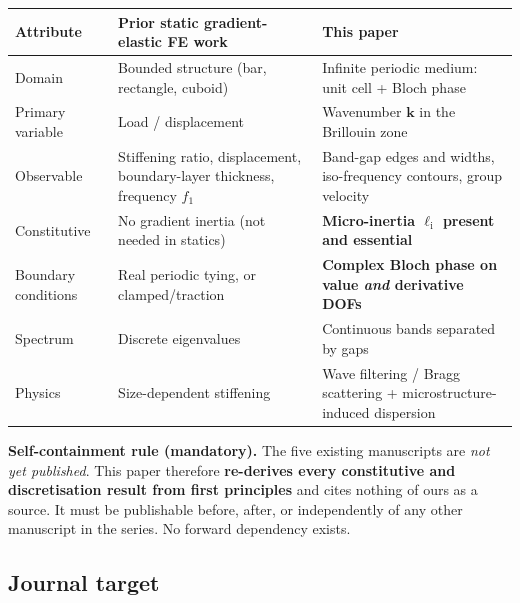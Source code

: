 \documentclass[11pt,a4paper]{article}
\begin{document}
\begin{tabularx}{\textwidth}{@{}L{3.1cm} Y Y@{}}
\toprule
Attribute & Prior static gradient-elastic FE work & \textbf{This paper} \\
\midrule
Domain & Bounded structure (bar, rectangle, cuboid) & Infinite periodic medium: unit cell + Bloch phase \\
Primary variable & Load / displacement & Wavenumber $\bm{k}$ in the Brillouin zone \\
Observable & Stiffening ratio, displacement, boundary-layer thickness, frequency $f_1$ & Band-gap edges and widths, iso-frequency contours, group velocity \\
Constitutive & No gradient inertia (not needed in statics) & \textbf{Micro-inertia $\ell_{\mathrm i}$ present and essential} \\
Boundary conditions & Real periodic tying, or clamped/traction & \textbf{Complex Bloch phase on value \emph{and} derivative DOFs} \\
Spectrum & Discrete eigenvalues & Continuous bands separated by gaps \\
Physics & Size-dependent stiffening & Wave filtering / Bragg scattering + microstructure-induced dispersion \\
\bottomrule
\end{tabularx}

\medskip
{\color{warn}\textbf{Self-containment rule (mandatory).}}
The five existing manuscripts are \emph{not yet published}. This paper therefore
\textbf{re-derives every constitutive and discretisation result from first principles}
and cites nothing of ours as a source. It must be publishable before, after, or
independently of any other manuscript in the series. No forward dependency exists.

\subsection{Journal target}
\end{document}
